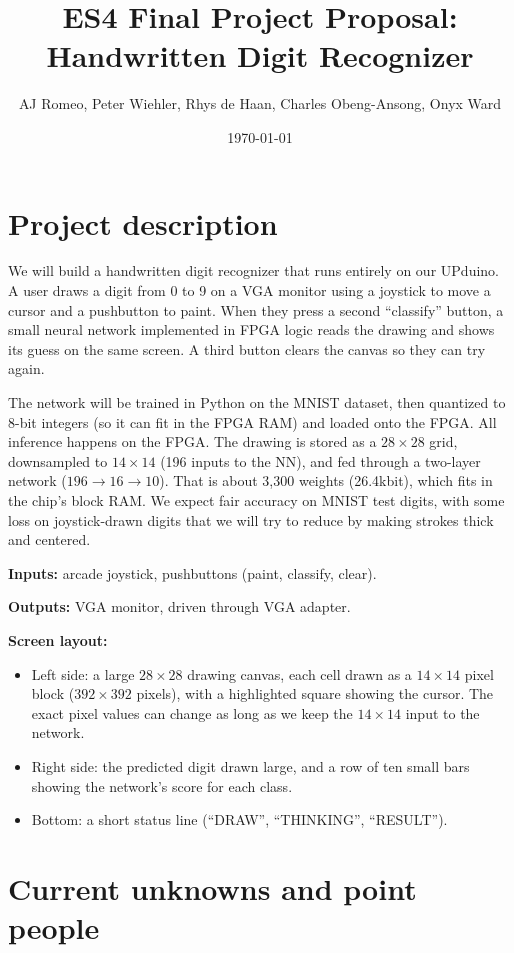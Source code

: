 \documentclass[11pt]{article}
\title{ES4 Final Project Proposal: Handwritten Digit Recognizer}
\author{AJ Romeo, Peter Wiehler, Rhys de Haan, Charles Obeng-Ansong, Onyx Ward}
\date{\today}
\begin{document}
\maketitle

\section{Project description}

We will build a handwritten digit recognizer that runs entirely on our UPduino. A user draws a digit from 0 to 9 on a VGA monitor using a joystick to move a cursor and a pushbutton to paint. When they press a second ``classify'' button, a small neural network implemented in FPGA logic reads the drawing and shows its guess on the same screen. A third button clears the canvas so they can try again.

The network will be trained in Python on the MNIST dataset, then quantized to 8-bit integers (so it can fit in the FPGA RAM) and loaded onto the FPGA. All inference happens on the FPGA. The drawing is stored as a $28\times28$ grid, downsampled to $14\times14$ (196 inputs to the NN), and fed through a two-layer network ($196 \rightarrow 16 \rightarrow 10$). That is about 3,300 weights (26.4kbit), which fits in the chip's block RAM. We expect fair accuracy on MNIST test digits, with some loss on joystick-drawn digits that we will try to reduce by making strokes thick and centered.

\medskip
\noindent\textbf{Inputs:} arcade joystick, pushbuttons (paint, classify, clear).

\noindent\textbf{Outputs:} VGA monitor, driven through VGA adapter.

\medskip
\noindent\textbf{Screen layout:}
\begin{itemize}
  \item Left side: a large $28\times28$ drawing canvas, each cell drawn as a $14\times14$ pixel block ($392\times392$ pixels), with a highlighted square showing the cursor. The exact pixel values can change as long as we keep the $14\times14$ input to the network.
  \item Right side: the predicted digit drawn large, and a row of ten small bars showing the network's score for each class.
  \item Bottom: a short status line (``DRAW'', ``THINKING'', ``RESULT'').
\end{itemize}

\section{Current unknowns and point people}
\end{document}
